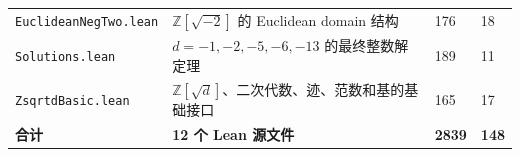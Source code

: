 \documentclass[UTF8,a4paper,12pt]{ctexart}
\newcommand{\leanfile}[1]{{\scriptsize\texttt{#1}}}
\begin{document}
\begin{longtable}{@{}L{4.75cm}L{8.35cm}R{1.15cm}R{1.3cm}@{}}
    \leanfile{EuclideanNegTwo.lean}
      & \(\mathbb{Z}[\sqrt{-2}]\) 的 Euclidean domain 结构
      & 176 & 18 \\

    \leanfile{Solutions.lean}
      & \(d=-1,-2,-5,-6,-13\) 的最终整数解定理
      & 189 & 11 \\

    \leanfile{ZsqrtdBasic.lean}
      & \(\mathbb{Z}[\sqrt d]\)、二次代数、迹、范数和基的基础接口
      & 165 & 17 \\

    \midrule
    \textbf{合计} & \textbf{12 个 Lean 源文件} & \textbf{2839} & \textbf{148} \\
\end{longtable}
\end{document}
